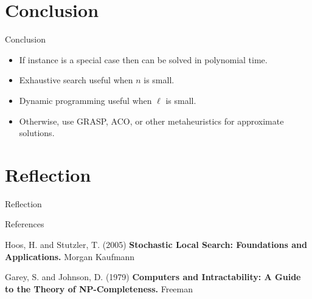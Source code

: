 \documentclass[aspectratio=169, compress, xcolor=table,xcolor=dvipsnames]{beamer}
\begin{document}
\section{Conclusion}

\begin{frame}
{Conclusion}

\begin{itemize}
	\item If instance is a special case then can be solved in polynomial time.
	\item Exhaustive search useful when $n$ is small.
	\item Dynamic programming useful when $\ell$ is small.
	\item Otherwise, use GRASP, ACO, or other metaheuristics for approximate solutions.
\end{itemize}
\end{frame}
%
%

\section{Reflection}

\begin{frame}
	{Reflection}

\end{frame}

\begin{frame}
{References}
	
	\begin{thebibliography}{References}
		\beamertemplatebookbibitems
		Hoos, H. and Stutzler, T. (2005)
		\textbf{Stochastic Local Search: Foundations and Applications.}
		Morgan Kaufmann

		Garey, S. and Johnson, D. (1979)
		\textbf{Computers and Intractability: A Guide to the Theory of NP-Completeness.}
		Freeman
				
	\end{thebibliography}
	
\end{frame}
\end{document}
